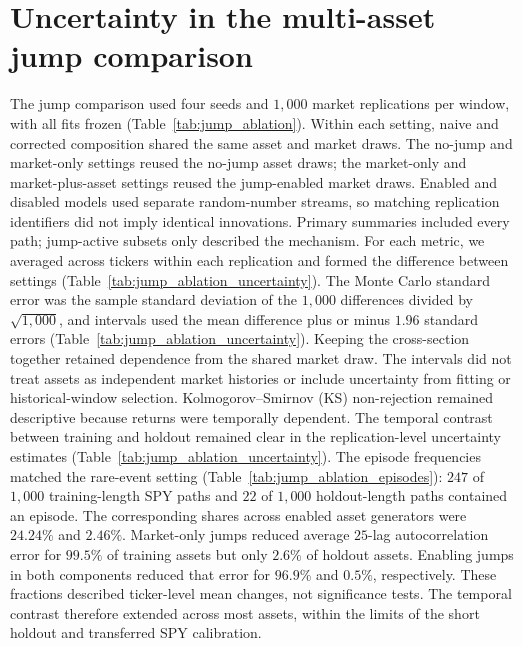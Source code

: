 \section{Uncertainty in the multi-asset jump comparison}
\label{sec:supp-jump-composition}

The jump comparison used four seeds and $1{,}000$ market
replications per window, with all fits frozen (Table~\ref{tab:jump_ablation}). Within each setting,
naive and corrected composition shared the same asset and market
draws. The no-jump and market-only settings reused the no-jump asset
draws; the market-only and market-plus-asset settings reused the
jump-enabled market draws. Enabled and disabled models used separate
random-number streams, so matching replication identifiers did not
imply identical innovations. Primary summaries included every path;
jump-active subsets only described the mechanism.
For each metric, we averaged across tickers within each replication
and formed the difference between settings
(Table~\ref{tab:jump_ablation_uncertainty}). The Monte Carlo standard
error was the sample standard deviation of the $1{,}000$ differences
divided by $\sqrt{1{,}000}$, and intervals used the mean difference
plus or minus $1.96$ standard errors
(Table~\ref{tab:jump_ablation_uncertainty}). Keeping the cross-section
together retained dependence from the shared market draw. The
intervals did not treat assets as independent market histories or
include uncertainty from fitting or historical-window selection.
Kolmogorov--Smirnov (KS) non-rejection remained descriptive because
returns were temporally dependent.
The temporal contrast between training and holdout remained clear
in the replication-level uncertainty estimates
(Table~\ref{tab:jump_ablation_uncertainty}). The episode frequencies
matched the rare-event setting (Table~\ref{tab:jump_ablation_episodes}):
$247$ of
$1{,}000$ training-length SPY paths and $22$ of $1{,}000$ holdout-length
paths contained an episode. The corresponding shares across enabled
asset generators were $24.24\%$ and $2.46\%$. Market-only jumps
reduced average $25$-lag autocorrelation error for $99.5\%$ of
training assets but only $2.6\%$ of holdout assets. Enabling jumps in
both components reduced that error for $96.9\%$ and $0.5\%$,
respectively. These fractions described ticker-level mean changes,
not significance tests. The temporal contrast therefore extended
across most assets, within the limits of the short holdout and
transferred SPY calibration.

